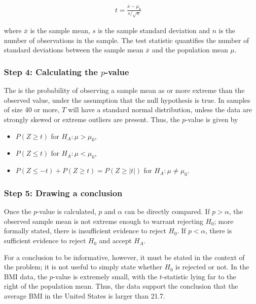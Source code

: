 \begin{spacing}{1.5}
\begin{align}
t=\frac{\overline{x}-\mu_0}{s/\sqrt{n}}
\end{align}

where $\overline{x}$ is the sample mean, $s$ is the sample standard deviation and $n$ is the number of observations in the sample. The test statistic quantifies the number of standard deviations between the sample mean $\overline{x}$ and the population mean $\mu$.

\subsubsection{Step 4: Calculating the $p$-value}

The  is the probability of observing a sample mean as or more extreme than the observed value, under the assumption that the null hypothesis is true. In samples of size 40 or more, $T$ will have a standard normal distribution, unless the data are strongly skewed or extreme outliers are present. Thus, the $p$-value is given by

\begin{itemize}
	\item $P(Z \geq t)$ for $H_A: \mu > \mu_0$,
	
	\item $P(Z \leq t)$ for $H_A: \mu < \mu_0$,
	
	\item $P(Z \leq -t) + P(Z \geq t) = P(Z \geq |t| )$ for $H_A: \mu \neq \mu_0.$
\end{itemize}

\subsubsection{Step 5: Drawing a conclusion}

Once the $p$-value is calculated, $p$ and $\alpha$ can be directly compared. If $p > \alpha$, the observed sample mean is not extreme enough to warrant rejecting $H_0$; more formally stated, there is insufficient evidence to reject $H_0$. If $p < \alpha$, there is sufficient evidence to reject $H_0$ and accept $H_A$. 

For a conclusion to be informative, however, it must be stated in the context of the problem; it is not useful to simply state whether $H_0$ is rejected or not. In the  BMI data, the $p$-value is extremely small, with the $t$-statistic lying far to the right of the population mean. Thus, the data support the conclusion that the average BMI in the United States is larger than 21.7. 


\end{spacing}

